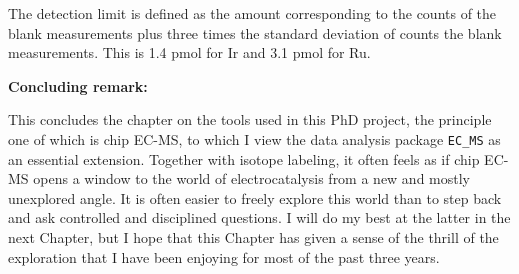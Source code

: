 The detection limit is defined as the amount corresponding to the counts of the blank measurements plus three times the standard deviation of counts the blank measurements\cite{Harris2010}. This is 1.4 pmol for Ir and 3.1 pmol for Ru.

\vspace{5mm}
\textbf{Concluding remark:}

This concludes the chapter on the tools used in this PhD project, the principle one of which is chip EC-MS, to which I view the data analysis package \texttt{EC\_MS} as an essential extension. Together with isotope labeling, it often feels as if chip EC-MS opens a window to the world of electrocatalysis from a new and mostly unexplored angle. It is often easier to freely explore this world than to step back and ask controlled and disciplined questions. I will do my best at the latter in the next Chapter, but I hope that this Chapter has given a sense of the thrill of the exploration that I have been enjoying for most of the past three years.
